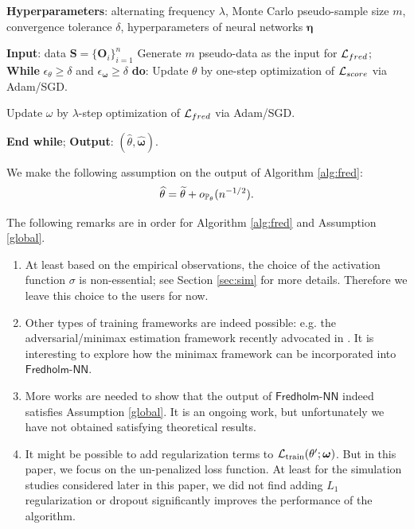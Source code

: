 \documentclass[11pt]{article}
\def\fred{\mathsf{Fredholm\mbox{-}NN}}
\def\train{\mathrm{train}}
\begin{document}
\begin{algorithm}
\caption{Pseudocode for the $\fred$ algorithm}\label{alg:fred}
\begin{algorithmic}[1]
\State \textbf{Hyperparameters}: alternating frequency $\lambda$, Monte Carlo pseudo-sample size $m$, convergence tolerance $\delta$, hyperparameters of neural networks $\bm{\eta}$

\State \textbf{Input}: data $\bm{S} = \{\bm{O}_i\}_{i=1}^n$
\State Generate $m$ pseudo-data as the input for ${\mathcal{L}}_{fred}$;
\State \textbf{While} $\epsilon_{\theta} \geq \delta$ and $\epsilon_{\bm{\omega}} \geq \delta$ \textbf{do}:
\State Update $\theta$ by one-step optimization of ${\mathcal{L}}_{score}$ via Adam/SGD.

\State Update $\omega$ by $\lambda$-step optimization of ${\mathcal{L}}_{fred}$ via Adam/SGD.

\State \textbf{End while};
\State \textbf{Output}: $(\hat{\theta}, \hat{\bm{\omega}})$.
\end{algorithmic}
\end{algorithm}

\begin{assumption}
\label{global}
We make the following assumption on the output of Algorithm \ref{alg:fred}:
\begin{equation}
\widehat{\theta} = \widetilde{\theta} + o_{{\mathbb{P}}_{\theta}} (n^{- 1 / 2}).
\end{equation}
\end{assumption}

\noindent The following remarks are in order for Algorithm \ref{alg:fred} and Assumption \ref{global}.
\begin{remark}\leavevmode
\begin{enumerate}[label = (\arabic*)]
\item At least based on the empirical observations, the choice of the activation function $\sigma$ is non-essential; see Section \ref{sec:sim} for more details. Therefore we leave this choice to the users for now.
\item Other types of training frameworks are indeed possible: e.g. the adversarial/minimax estimation framework recently advocated in \citet{hirshberg2017augmented, chernozhukov2020adversarial, ghassami2021minimax, kallus2021causal}. It is interesting to explore how the minimax framework can be incorporated into $\fred$.
\item More works are needed to show that the output of $\fred$ indeed satisfies Assumption \ref{global}. It is an ongoing work, but unfortunately we have not obtained satisfying theoretical results.
\item It might be possible to add regularization terms to $\calL_{\train} (\theta'; \bm{\omega})$. But in this paper, we focus on the un-penalized loss function. At least for the simulation studies considered later in this paper, we did not find adding $L_{1}$ regularization or dropout significantly improves the performance of the algorithm.
\end{enumerate}
\end{remark}
\end{document}

